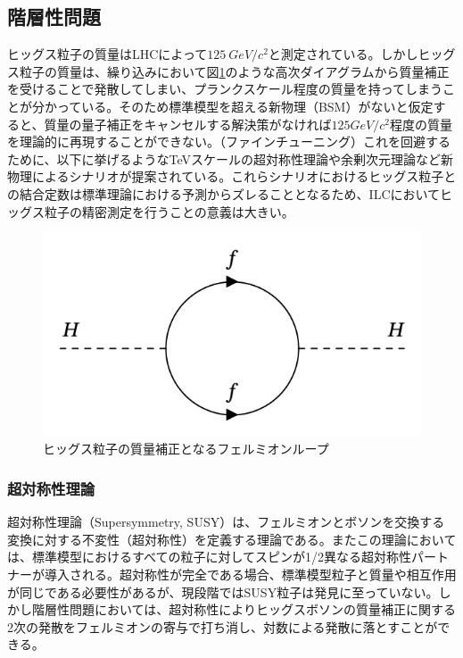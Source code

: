 \subsection{階層性問題}
ヒッグス粒子の質量はLHCによって$125\ GeV/c^2$と測定されている。しかしヒッグス粒子の質量は、繰り込みにおいて図\ref{hierarchy}のような高次ダイアグラムから質量補正を受けることで発散してしまい、プランクスケール程度の質量を持ってしまうことが分かっている。そのため標準模型を超える新物理（BSM）がないと仮定すると、質量の量子補正をキャンセルする解決策がなければ$125GeV/c^2$程度の質量を理論的に再現することができない。（ファインチューニング）これを回避するために、以下に挙げるようなTeVスケールの超対称性理論や余剰次元理論など新物理によるシナリオが提案されている。これらシナリオにおけるヒッグス粒子との結合定数は標準理論における予測からズレることとなるため、ILCにおいてヒッグス粒子の精密測定を行うことの意義は大きい。
\begin{figure}[h]
	\begin{center}
 \includegraphics[keepaspectratio, scale=0.4]
 	{Figure/Introduction/feynman.png}
 		\caption{ヒッグス粒子の質量補正となるフェルミオンループ}
 		\label{hierarchy}
	\end{center}
\end{figure}
\subsubsection{超対称性理論}
超対称性理論（Supersymmetry, SUSY）は、フェルミオンとボソンを交換する変換に対する不変性（超対称性）を定義する理論である。またこの理論においては、標準模型におけるすべての粒子に対してスピンが1/2異なる超対称性パートナーが導入される。超対称性が完全である場合、標準模型粒子と質量や相互作用が同じである必要性があるが、現段階ではSUSY粒子は発見に至っていない。しかし階層性問題においては、超対称性によりヒッグスボソンの質量補正に関する2次の発散をフェルミオンの寄与で打ち消し、対数による発散に落とすことができる。
